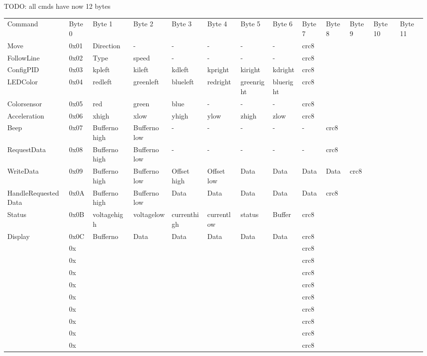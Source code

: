 \documentclass[a4paper]{article}
\begin{document}
\begin{landscape}

TODO: all cmds have now 12 bytes

\begin{tabular}{lllllllllllll}
Command &
    Byte 0 &
    Byte 1 &
    Byte 2 &
    Byte 3 &
    Byte 4 &
    Byte 5 &
    Byte 6 &
    Byte 7 &
    Byte 8 &
    Byte 9 &
    Byte 10 &
    Byte 11 \\
Move &
    0x01 &
    Direction &
    - &
    - &
    - &
    - &
    - &
    crc8 \\
FollowLine &
    0x02 &
    Type &
    speed &
    - &
    - &
    - &
    - &
    crc8 \\
ConfigPID &
    0x03 &
    kpleft &
    kileft &
    kdleft &
    kpright &
    kiright &
    kdright &
    crc8 \\
LEDColor &
    0x04 &
    redleft &
    greenleft &
    blueleft &
    redright &
    greenright &
    blueright &
    crc8 \\
Colorsensor &
    0x05 &
    red &
    green &
    blue &
    - &
    - &
    - &
    crc8 \\
Acceleration &
    0x06 &
    xhigh &
    xlow &
    yhigh &
    ylow &
    zhigh &
    zlow &
    crc8 \\
Beep &
    0x07 &
    Bufferno high &
    Bufferno low &
    - &
    - &
    - &
    - &
    - &
    crc8 \\
RequestData &
    0x08 &
    Bufferno high &
    Bufferno low &
    - &
    - &
    - &
    - &
    - &
    crc8 \\
WriteData &
    0x09 &
    Bufferno high &
    Bufferno low &
    Offset high &
    Offset low &
    Data &
    Data &
    Data &
    Data &
    crc8 \\
HandleRequestedData &
    0x0A &
    Bufferno high &
    Bufferno low &
    Data &
    Data &
    Data &
    Data &
    Data &
    crc8 \\
Status &
    0x0B &
    voltagehigh &
    voltagelow &
    currenthigh &
    currentlow &
    status &
    Buffer &
    crc8 \\
Display &
    0x0C &
    Bufferno &
    Data &
    Data &
    Data &
    Data &
    Data &
    crc8 \\
 &
    0x &
     &
     &
     &
     &
     &
     &
    crc8 \\
 &
    0x &
     &
     &
     &
     &
     &
     &
    crc8 \\
 &
    0x &
     &
     &
     &
     &
     &
     &
    crc8 \\
 &
    0x &
     &
     &
     &
     &
     &
     &
    crc8 \\
 &
    0x &
     &
     &
     &
     &
     &
     &
    crc8 \\
 &
    0x &
     &
     &
     &
     &
     &
     &
    crc8 \\
 &
    0x &
     &
     &
     &
     &
     &
     &
    crc8 \\
 &
    0x &
     &
     &
     &
     &
     &
     &
    crc8 \\
 &
    0x &
     &
     &
     &
     &
     &
     &
    crc8 \\

\end{tabular}
\end{landscape}
\end{document}
